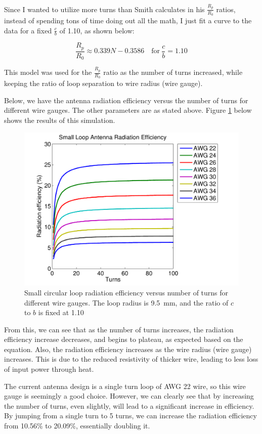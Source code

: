 \documentclass[12pt,onecolumn,titlepage]{article}
\begin{document}
Since I wanted to utilize more turns than Smith calculates in his $\frac{R_p}{R_0}$ ratios, instead of spending tons of time doing out all the math, I just fit a curve to the data for a fixed $\frac{c}{b}$ of 1.10, as shown below:

\[ \frac{R_p}{R_0} \approx 0.339N - 0.3586 \quad \text{for} ~ \frac{c}{b} = 1.10 \]

This model was used for the $\frac{R_p}{R_0}$ ratio as the number of turns increased, while keeping the ratio of loop separation to wire radius (wire gauge).

Below, we have the antenna radiation efficiency versus the number of turns for different wire gauges. The other parameters are as stated above. Figure \ref{fig:rad_eff_v_turns} below shows the results of this simulation.


\begin{figure}[htbp]
	\centering
	\includegraphics[width=\textwidth]{Pictures/8May2013/rad_eff_v_turns}
	\caption{Small circular loop radiation efficiency versus number of turns for different wire gauges. The loop radius is 9.5~mm, and the ratio of $c$ to $b$ is fixed at 1.10}
	\label{fig:rad_eff_v_turns}
\end{figure}

From this, we can see that as the number of turns increases, the radiation efficiency increase decreases, and begins to plateau, as expected based on the equation. Also, the radiation efficiency increases as the wire radius (wire gauge) increases. This is due to the reduced resistivity of thicker wire, leading to less loss of input power through heat. 

The current antenna design is a single turn loop of AWG 22 wire, so this wire gauge is seemingly a good choice. However, we can clearly see that by increasing the number of turns, even slightly, will lead to a significant increase in efficiency. By jumping from a single turn to 5 turns, we can increase the radiation efficiency from 10.56\% to 20.09\%, essentially doubling it.
\end{document}
